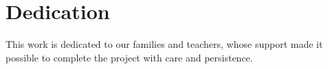 \chapter*{Dedication}
This work is dedicated to our families and teachers, whose support made it possible to complete the project with care and persistence.
